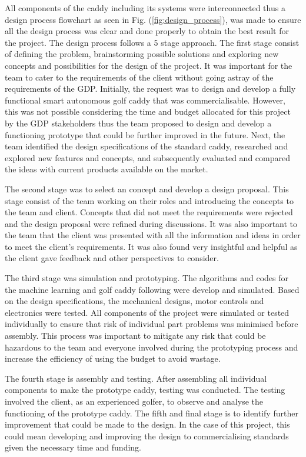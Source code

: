 \documentclass[11pt,landscape]{article}
\begin{document}
\begin{multicols}{3}
All components of the caddy including its systems were interconnected thus a
design process flowchart as seen in Fig. (\ref{fig:design_process}), was made to
ensure all the design process was clear and done properly to obtain the best
result for the project. The design process follows a 5 stage approach. The first
stage consist of defining the problem, brainstorming possible solutions and
exploring new concepts and possibilities for the design of the project. It was
important for the team to cater to the requirements of the client without going
astray of the requirements of the GDP. Initially, the request was to design and
develop a fully functional smart autonomous golf caddy that was
commercialisable. However, this was not possible considering the time and budget
allocated for this project by the GDP stakeholders thus the team proposed to
design and develop a functioning prototype that could be further improved in the
future. Next, the team identified the design specifications of the standard
caddy, researched and explored new features and concepts, and subsequently
evaluated and compared the ideas with current products available on the market. 


The second stage was to select an concept and develop a design proposal. This
stage consist of the team working on their roles and introducing the concepts to the
team and client. Concepts that did not meet the requirements were rejected and
the design proposal were refined during discussions. It was also important to
the team that the client was presented with all the information and ideas in
order to meet the client’s requirements. It was also found very insightful and
helpful as the client gave feedback and other perspectives to consider. 

The third stage was simulation and prototyping. The algorithms and codes for the
machine learning and golf caddy following were develop and simulated. Based on
the design specifications, the mechanical designs, motor controls and
electronics were tested. All components of the project were simulated or tested
individually to ensure that risk of individual part problems was minimised
before assembly. This process was important to mitigate any risk that could be
hazardous to the team and everyone involved during the prototyping process and
increase the efficiency of using the budget to avoid wastage. 

The fourth stage is assembly and testing. After assembling all individual
components to make the prototype caddy, testing was conducted. The testing
involved the client, as an experienced golfer, to observe and analyse the
functioning of the prototype caddy. The fifth and
final stage is to identify further improvement that could be made to the design.
In the case of this project, this could mean developing and improving the design
to commercialising standards given the necessary time and funding. 


\end{multicols}
\end{document}
